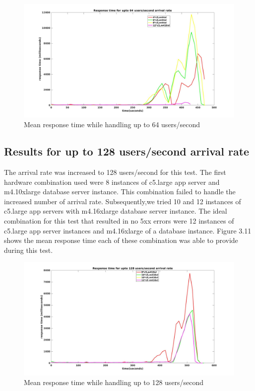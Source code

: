 \begin{figure}[h]
	\centering
	\includegraphics[width=1\textwidth]{images/scale64.jpg}
	\caption{Mean response time while handling up to 64 users/second}\label{fig:sqlopt}
\end{figure}


\subsection{Results for up to 128 users/second arrival rate}
The arrival rate was increased to 128 users/second for this test. The first hardware combination used were 8 instances of c5.large app server and m4.10xlarge database server instance. This combination failed to handle the increased number of arrival rate. Subsequently,we tried 10 and 12 instances of c5.large app servers with m4.16xlarge database server instance. The ideal combination for this test that resulted in no 5xx errors were 12 instances of c5.large app server instances and m4.16xlarge of a database instance. Figure 3.11 shows the mean response time each of these combination was able to provide during this test.

\begin{figure}[h]
	\centering
	\includegraphics[width=1\textwidth]{images/scale128.jpg}
	\caption{Mean response time while handling up to 128 users/second}\label{fig:sqlopt}
\end{figure}



